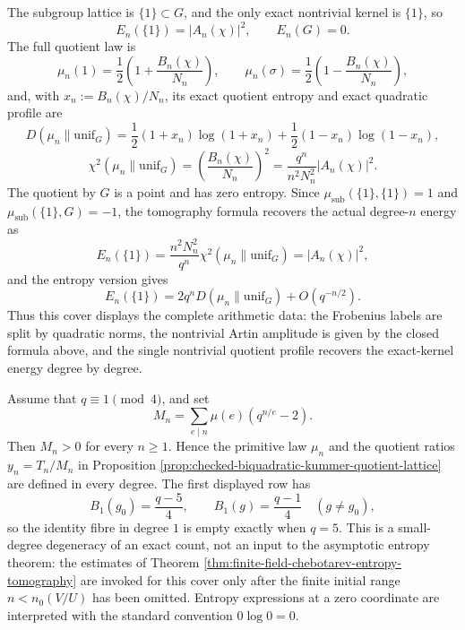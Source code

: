 \begin{example}
\[\]
The subgroup lattice is \(\{1\}\subset G\), and the only exact nontrivial kernel is \(\{1\}\), so
\[
E_n(\{1\})=|A_n(\chi)|^2,
\qquad E_n(G)=0.
\]
The full quotient law is
\[
\mu_n(1)=\frac12\left(1+\frac{B_n(\chi)}{N_n}\right),
\qquad
\mu_n(\sigma)=\frac12\left(1-\frac{B_n(\chi)}{N_n}\right),
\]
and, with \(x_n:=B_n(\chi)/N_n\), its exact quotient entropy and exact quadratic profile are
\[
D(\mu_n\|\mathrm{unif}_G)
=\frac12(1+x_n)\log(1+x_n)
+\frac12(1-x_n)\log(1-x_n),
\]
\[
\chi^2(\mu_n\|\mathrm{unif}_G)
=\left(\frac{B_n(\chi)}{N_n}\right)^2
=\frac{q^n}{n^2N_n^2}|A_n(\chi)|^2.
\]
The quotient by \(G\) is a point and has zero entropy. Since \(\mu_{\mathrm{sub}}(\{1\},\{1\})=1\) and \(\mu_{\mathrm{sub}}(\{1\},G)=-1\), the tomography formula recovers the actual degree-\(n\) energy as
\[
E_n(\{1\})
=\frac{n^2N_n^2}{q^n}\chi^2(\mu_n\|\mathrm{unif}_G)
=|A_n(\chi)|^2,
\]
and the entropy version gives
\[
E_n(\{1\})=2q^nD(\mu_n\|\mathrm{unif}_G)+O(q^{-n/2}).
\]
Thus this cover displays the complete arithmetic data: the Frobenius labels are split by quadratic norms, the nontrivial Artin amplitude is given by the closed formula above, and the single nontrivial quotient profile recovers the exact-kernel energy degree by degree.
\end{example}

\begin{lemma}\label{lem:biquadratic-kummer-admissible-degrees}
Assume that \(q\equiv1\pmod4\), and set
\[
M_n=\sum_{e\mid n}\mu(e)(q^{n/e}-2).
\]
Then \(M_n>0\) for every \(n\ge1\).  Hence the primitive law \(\mu_n\) and the quotient ratios \(y_n=T_n/M_n\) in Proposition \ref{prop:checked-biquadratic-kummer-quotient-lattice} are defined in every degree.  The first displayed row has
\[
B_1(g_0)=\frac{q-5}{4},
\qquad
B_1(g)=\frac{q-1}{4}\quad(g\ne g_0),
\]
so the identity fibre in degree \(1\) is empty exactly when \(q=5\).  This is a small-degree degeneracy of an exact count, not an input to the asymptotic entropy theorem: the estimates of Theorem \ref{thm:finite-field-chebotarev-entropy-tomography} are invoked for this cover only after the finite initial range \(n<n_0(V/U)\) has been omitted.  Entropy expressions at a zero coordinate are interpreted with the standard convention \(0\log0=0\).
\end{lemma}

